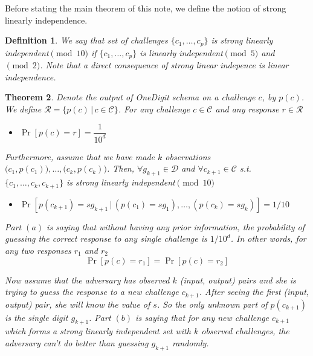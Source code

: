 \documentclass{article}
\newtheorem{theorem}{Theorem}
\newtheorem{definition}[theorem]{Definition}
\begin{document}
Before stating the main theorem of this note, we define the notion of strong linearly independence.

\begin{definition}
We say that set of challenges $\{c_1,\ldots,c_p\}$ is strong linearly independent$\pmod{10}$ if $\{c_1,\ldots,c_p\}$ is linearly independent$\pmod{5}$ and$\pmod{2}$. Note that a direct consequence of strong linear indepence is linear independence.
\end{definition}
                                                                                                            

\begin{theorem}
\label{thm:main}
	Denote the output of OneDigit schema on a challenge $c$, by $p(c)$. We define $\mathcal{R}=\{p(c) \, | \, c\in\mathcal{C}\}$. For any challenge $c\in \mathcal{C}$ and any response $r\in \mathcal{R}$
	\begin{itemize} 
		\item[$(a)$]$\Pr[p(c)=r]=\dfrac{1}{10^d}$
	\end{itemize}
Furthermore, assume that we have made $k$ observations $\big(c_1,p(c_1)\big),\ldots, \big(c_k, p(c_k)\big)$. Then, $\forall g_{k+1}\in\mathcal{D}$ and $\forall c_{k+1}\in \mathcal{C}$ s.t. $\{c_1,\ldots,c_k,c_{k+1}\}$ is strong linearly independent$\pmod{10}$ 
	\begin{itemize}
		\item[$(b)$] $\Pr[p(c_{k+1})=s g_{k+1} \, | \, (p(c_1)=s g_1),\ldots, (p(c_k)=s g_k)]=1/10$
	\end{itemize}
Part $(a)$ is saying that without having any prior information, the probability of guessing the correct response to any single challenge is ${1}/{10^d}$. In other words, for any two responses $r_1$ and $r_2$
$$\Pr[p(c)=r_1]=\Pr[p(c)=r_2]$$

\noindent Now assume that the adversary has observed $k$ (input, output) pairs and she is trying to guess the response to a new challenge $c_{k+1}$. After seeing the first (input, output) pair, she will know the value of $s$. So the only unknown part of $p(c_{k+1})$ is the single digit $g_{k+1}$. Part $(b)$ is saying that for any new challenge $c_{k+1}$ which forms a strong linearly independent set with $k$ observed challenges, the adversary can't do better than guessing $g_{k+1}$ randomly.

\end{theorem}
\end{document}
